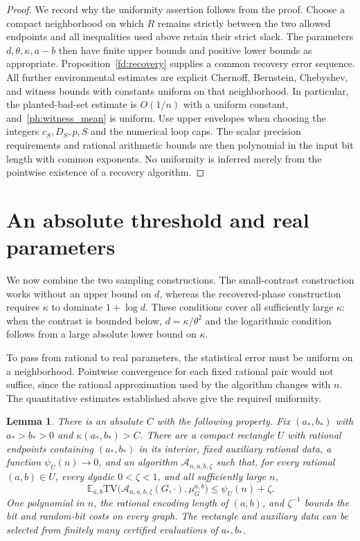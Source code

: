 \documentclass[11pt]{article}
\newcommand{\TV}{\mathrm{TV}}
\def\E{\mathbb{E}}
\newtheorem{lemma}[thm]{Lemma}
\numberwithin{equation}{section}
\begin{document}
\begin{proof}
We record why the uniformity assertion follows from the proof. Choose a compact neighborhood on which $R$ remains strictly between the two allowed endpoints and all inequalities used above retain their strict slack. The parameters $d,\theta,\kappa,a-b$ then have finite upper bounds and positive lower bounds as appropriate. Proposition~\ref{fd:recovery} supplies a common recovery error sequence. All further environmental estimates are explicit Chernoff, Bernstein, Chebyshev, and witness bounds with constants uniform on that neighborhood. In particular, the planted-bad-set estimate is $O(1/n)$ with a uniform constant, and~\eqref{ph:witness_mean} is uniform. Use upper envelopes when choosing the integers $c_S,D_S,p,S$ and the numerical loop caps. The scalar precision requirements and rational arithmetic bounds are then polynomial in the input bit length with common exponents. No uniformity is inferred merely from the pointwise existence of a recovery algorithm.
\end{proof}


\section{An absolute threshold and real parameters}\label{sec:precision}

We now combine the two sampling constructions. The small-contrast construction works without an upper bound on $d$, whereas the recovered-phase construction requires $\kappa$ to dominate $1+\log d$. These conditions cover all sufficiently large $\kappa$: when the contrast is bounded below, $d=\kappa/\theta^2$ and the logarithmic condition follows from a large absolute lower bound on $\kappa$.

To pass from rational to real parameters, the statistical error must be uniform on a neighborhood. Pointwise convergence for each fixed rational pair would not suffice, since the rational approximation used by the algorithm changes with $n$. The quantitative estimates established above give the required uniformity.

\begin{lemma}\label{pr:uniform}
There is an absolute $C$ with the following property. Fix $(a_*,b_*)$ with $a_*>b_*>0$ and $\kappa(a_*,b_*)>C$. There are a compact rectangle $U$ with rational endpoints containing $(a_*,b_*)$ in its interior, fixed auxiliary rational data, a function $\psi_U(n)\to0$, and an algorithm $\mathcal A_{n,a,b,\zeta}$ such that, for every rational $(a,b)\in U$, every dyadic $0<\zeta<1$, and all sufficiently large $n$,
\[
 \E_{a,b}\TV\big(\mathcal A_{n,a,b,\zeta}(G,\cdot),\mu_G^{a,b}\big)
 \le\psi_U(n)+\zeta.
\]
One polynomial in $n$, the rational encoding length of $(a,b)$, and $\zeta^{-1}$ bounds the bit and random-bit costs on every graph. The rectangle and auxiliary data can be selected from finitely many certified evaluations of $a_*,b_*$.
\end{lemma}
\end{document}
